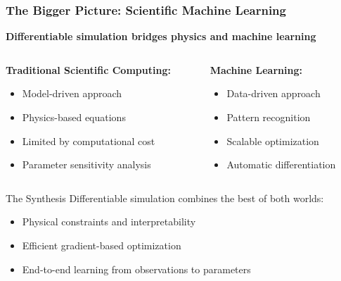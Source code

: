 \documentclass[notes]{beamer}
\begin{document}
\begin{frame}
\frametitle{The Bigger Picture: Scientific Machine Learning}

\begin{center}
\textbf{Differentiable simulation bridges physics and machine learning}
\end{center}

\vspace{1cm}

\begin{columns}[T]
    \begin{column}{0.5\textwidth}
        \textbf{Traditional Scientific Computing:}
        \begin{itemize}
            \item Model-driven approach
            \item Physics-based equations
            \item Limited by computational cost
            \item Parameter sensitivity analysis
        \end{itemize}
    \end{column}
    \begin{column}{0.5\textwidth}
        \textbf{Machine Learning:}
        \begin{itemize}
            \item Data-driven approach
            \item Pattern recognition
            \item Scalable optimization
            \item Automatic differentiation
        \end{itemize}
    \end{column}
\end{columns}

\vspace{1cm}

\begin{alertblock}{The Synthesis}
Differentiable simulation combines the best of both worlds:
\begin{itemize}
    \item Physical constraints and interpretability
    \item Efficient gradient-based optimization
    \item End-to-end learning from observations to parameters
\end{itemize}
\end{alertblock}

\end{frame}
\end{document}
